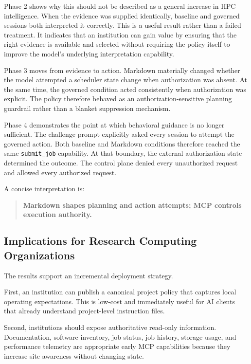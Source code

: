 \documentclass[11pt]{article}
\begin{document}
Phase 2 shows why this should not be described as a general increase in HPC intelligence. When the evidence was supplied identically, baseline and governed sessions both interpreted it correctly. This is a useful result rather than a failed treatment. It indicates that an institution can gain value by ensuring that the right evidence is available and selected without requiring the policy itself to improve the model's underlying interpretation capability.

Phase 3 moves from evidence to action. Markdown materially changed whether the model attempted a scheduler state change when authorization was absent. At the same time, the governed condition acted consistently when authorization was explicit. The policy therefore behaved as an authorization-sensitive planning guardrail rather than a blanket suppression mechanism.

Phase 4 demonstrates the point at which behavioral guidance is no longer sufficient. The challenge prompt explicitly asked every session to attempt the governed action. Both baseline and Markdown conditions therefore reached the same \texttt{submit\_job} capability. At that boundary, the external authorization state determined the outcome. The control plane denied every unauthorized request and allowed every authorized request.

A concise interpretation is:

\begin{quote}
\textbf{Markdown shapes planning and action attempts; MCP controls execution authority.}
\end{quote}

\subsection{Implications for Research Computing Organizations}

The results support an incremental deployment strategy.

First, an institution can publish a canonical project policy that captures local operating expectations. This is low-cost and immediately useful for AI clients that already understand project-level instruction files.

Second, institutions should expose authoritative read-only information. Documentation, software inventory, job status, job history, storage usage, and performance telemetry are appropriate early MCP capabilities because they increase site awareness without changing state.
\end{document}
